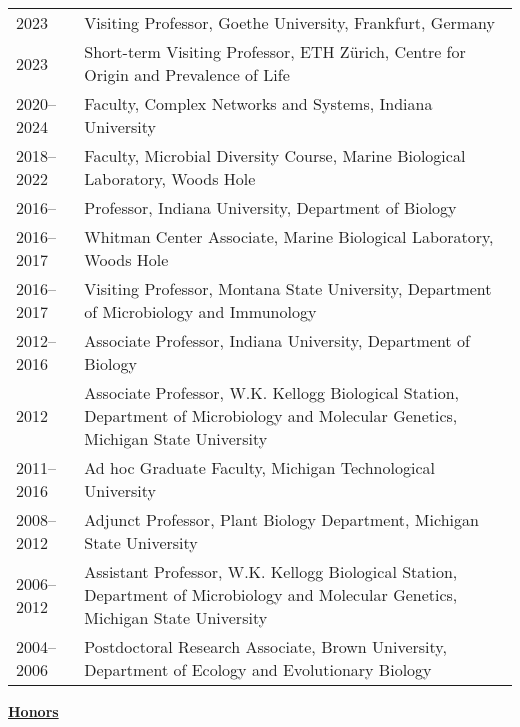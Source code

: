 \documentclass[11pt]{article}  %
\begin{document}
\begin{tabularx}{\textwidth}{@{}l@{\hspace{2em}}X@{}}
2023         & Visiting Professor, Goethe University, Frankfurt, Germany \\
2023         & Short-term Visiting Professor, ETH Zürich, Centre for Origin and Prevalence of Life \\
2020--2024   & Faculty, Complex Networks and Systems, Indiana University \\
2018--2022   & Faculty, Microbial Diversity Course, Marine Biological Laboratory, Woods Hole \\
2016--       & Professor, Indiana University, Department of Biology \\
2016--2017   & Whitman Center Associate, Marine Biological Laboratory, Woods Hole \\
2016--2017   & Visiting Professor, Montana State University, Department of Microbiology and Immunology \\
2012--2016   & Associate Professor, Indiana University, Department of Biology\\
2012         & Associate Professor, W.K. Kellogg Biological Station, Department of Microbiology and Molecular Genetics, Michigan State University \\
2011--2016   & Ad hoc Graduate Faculty, Michigan Technological University \\
2008--2012   & Adjunct Professor, Plant Biology Department, Michigan State University \\
2006--2012   & Assistant Professor, W.K. Kellogg Biological Station, Department of Microbiology and Molecular Genetics, Michigan State University \\
2004--2006   & Postdoctoral Research Associate, Brown University, Department of Ecology and Evolutionary Biology \\
\end{tabularx}

\noindent\underline{\textbf{Honors}}\\[-2em] %
\noindent
\end{document}
